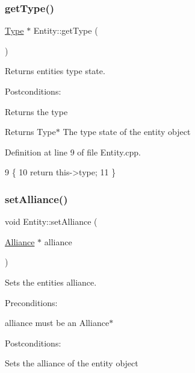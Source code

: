 \subsubsection{\texorpdfstring{get\+Type()}{getType()}}
{\footnotesize\ttfamily \hyperlink{classType}{Type} $\ast$ Entity\+::get\+Type (\begin{DoxyParamCaption}{ }\end{DoxyParamCaption})}



Returns entities type state. 

Postconditions\+:
\begin{DoxyItemize}
\item Returns the type
\end{DoxyItemize}

\begin{DoxyReturn}{Returns}
Type$\ast$ The type state of the entity object 
\end{DoxyReturn}


Definition at line 9 of file Entity.\+cpp.


\begin{DoxyCode}
9                       \{
10     \textcolor{keywordflow}{return} this->type;
11 \}
\end{DoxyCode}
\mbox{\label{classEntity_af804dcaa600e770cf0e2b4537f6fba23}} 
\subsubsection{\texorpdfstring{set\+Alliance()}{setAlliance()}}
{\footnotesize\ttfamily void Entity\+::set\+Alliance (\begin{DoxyParamCaption}\item[{\hyperlink{classAlliance}{Alliance} $\ast$}]{alliance }\end{DoxyParamCaption})}



Sets the entities alliance. 

Preconditions\+:
\begin{DoxyItemize}
\item alliance must be an Alliance$\ast$
\end{DoxyItemize}

Postconditions\+:
\begin{DoxyItemize}
\item Sets the alliance of the entity object
\end{DoxyItemize}


